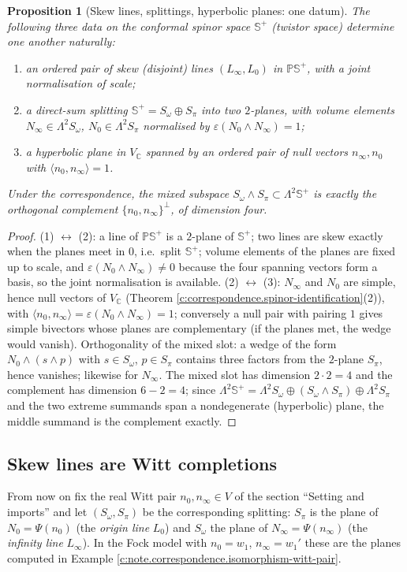 \documentclass[11pt]{article}
\newtheorem{proposition}[theorem]{Proposition}
\theoremstyle{definition}
\theoremstyle{plain}
\newcommand{\changedmark}[2]{\marginpar{\raggedright\scriptsize\color{#1}#2}}
\providecommand{\C}{}\renewcommand{\C}{\mathbb{C}}
\providecommand{\CS}{}\renewcommand{\CS}{{\mathbb{S}^{+}}}
\providecommand{\PCS}{}\renewcommand{\PCS}{\mathbb{P}{\mathbb{S}^{+}}}
\providecommand{\Som}{}\renewcommand{\Som}{S_\omega}
\providecommand{\Spi}{}\renewcommand{\Spi}{S_\pi}
\providecommand{\nInf}{}\renewcommand{\nInf}{n_\infty}
\providecommand{\nO}{}\renewcommand{\nO}{n_0}
\providecommand{\ip}{}\renewcommand{\ip}[2]{\langle #1, #2\rangle}
\begin{document}
\begin{proposition}[Skew lines, splittings, hyperbolic planes: one datum]\label{c:correspondence.skew-lines-splittings-hyperbolic-planes-one}
\changedmark{gray}{reworded}
The following three data on the conformal spinor space $\CS$ (twistor space) determine one another naturally:
\begin{enumerate}
\item an ordered pair of skew (disjoint) lines $(L_\infty, L_0)$ in $\PCS$, with a joint normalisation of scale;
\item a direct-sum splitting $\CS = \Som \oplus \Spi$ into two $2$-planes, with volume elements $N_\infty \in \Lambda^2\Som$, $N_0 \in \Lambda^2\Spi$ normalised by $\varepsilon(N_0 \wedge N_\infty) = 1$;
\item a hyperbolic plane in $V_\C$ spanned by an ordered pair of null vectors $\nInf, \nO$ with $\ip{\nO}{\nInf} = 1$.
\end{enumerate}
Under the correspondence, the mixed subspace $\Som \wedge \Spi \subset \Lambda^2\CS$ is exactly the orthogonal complement $\{\nO, \nInf\}^\perp$, of dimension four.
\end{proposition}
\begin{proof}
(1) $\leftrightarrow$ (2): a line of $\PCS$ is a $2$-plane of $\CS$; two lines are skew exactly when the planes meet in $0$, i.e.\ split $\CS$; volume elements of the planes are fixed up to scale, and $\varepsilon(N_0\wedge N_\infty) \neq 0$ because the four spanning vectors form a basis, so the joint normalisation is available. (2) $\leftrightarrow$ (3): $N_\infty$ and $N_0$ are simple, hence null vectors of $V_\C$ (Theorem \ref{c:correspondence.spinor-identification}(2)), with $\ip{\nO}{\nInf} = \varepsilon(N_0\wedge N_\infty) = 1$; conversely a null pair with pairing $1$ gives simple bivectors whose planes are complementary (if the planes met, the wedge would vanish). Orthogonality of the mixed slot: a wedge of the form $N_0 \wedge (s\wedge p)$ with $s \in \Som$, $p \in \Spi$ contains three factors from the $2$-plane $\Spi$, hence vanishes; likewise for $N_\infty$. The mixed slot has dimension $2 \cdot 2 = 4$ and the complement has dimension $6 - 2 = 4$; since $\Lambda^2\CS = \Lambda^2\Som \oplus (\Som\wedge\Spi) \oplus \Lambda^2\Spi$ and the two extreme summands span a nondegenerate (hyperbolic) plane, the middle summand is the complement exactly.

\end{proof}

\subsection*{Skew lines are Witt completions}
\label{c:note.correspondence.setting-skew-lines-are-witt-completions}
From now on fix the real Witt pair $\nO, \nInf \in V$ of the section ``Setting and imports'' and let $(\Som, \Spi)$ be the corresponding splitting: $\Spi$ is the plane of $N_0 = \Psi(\nO)$ (the \emph{origin line} $L_0$) and $\Som$ the plane of $N_\infty = \Psi(\nInf)$ (the \emph{infinity line} $L_\infty$). In the Fock model with $\nO = w_1$, $\nInf = w_1'$ these are the planes computed in Example \ref{c:note.correspondence.isomorphism-witt-pair}.
\end{document}
